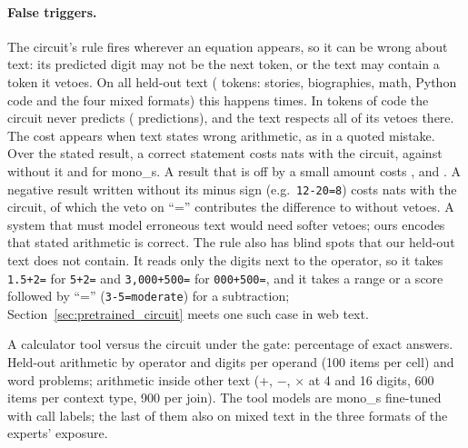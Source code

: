 \documentclass[10pt]{article}
\newcommand{\pending}[1]{{\color{red}\textbf{[#1]}}}
\begin{document}
\paragraph{False triggers.} The circuit's rule fires wherever an equation appears, so it can be
wrong about text: its predicted digit may not be the next token, or the text may contain a token
it vetoes. On all held-out text (\resTrackCFalseScanTokens{} tokens: stories, biographies,
math, Python code and the four mixed formats) this happens \resTrackCFalseClaims{} times. In
\resTrackCFalseScanCodeTokens{} tokens of code the circuit never predicts
(\resTrackCCodePredictions{} predictions), and the text respects all \resTrackCCodeVetoes{} of
its vetoes there. The cost appears when text states wrong arithmetic, as in a quoted mistake.
Over the stated result, a correct statement costs \resTrackCStressAtomCorrect{} nats with the
circuit, against \resTrackCStressConfCorrect{} without it and \resTrackCStressMonoSCorrect{} for
mono\_s. A result that is off by a small amount costs \resTrackCStressAtomWrong{},
\resTrackCStressConfWrong{} and \resTrackCStressMonoSWrong{}. A negative result written without
its minus sign (e.g.\ \texttt{12-20=8}) costs \resTrackCStressAtomSign{} nats with the circuit,
of which the veto on ``='' contributes the difference to \resTrackCStressNoVetoSign{} without
vetoes. A system that must model erroneous text would need softer vetoes; ours encodes that
stated arithmetic is correct. The rule also has blind spots that our held-out text does not
contain. It reads only the digits next to the operator, so it takes \texttt{1.5+2=} for
\texttt{5+2=} and \texttt{3{,}000+500=} for \texttt{000+500=}, and it takes a range or a score
followed by ``='' (\texttt{3-5=moderate}) for a subtraction; Section~\ref{sec:pretrained_circuit}
meets one such case in web text.
\begin{table}[t]
\centering\small
\caption{A calculator tool versus the circuit under the gate: percentage of exact answers.
Held-out arithmetic by operator and digits per operand (100 items per cell) and word problems;
arithmetic inside other text (+, $-$, $\times$ at 4 and 16 digits, 600 items per context type,
900 per join). The tool models are mono\_s fine-tuned with call labels; the last of them also
on mixed text in the three formats of the experts' exposure.}
\label{tab:scratch_tool}
{\footnotesize\setlength{\tabcolsep}{2.5pt}\IfFileExists{tables/track_c_tool.tex}{}{\pending{table}}}
\end{table}
\end{document}
